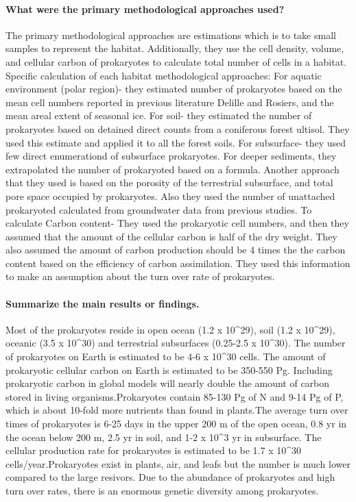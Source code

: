 \documentclass[]{article}
\let\oldparagraph\paragraph
\renewcommand{\paragraph}[1]{\oldparagraph{#1}\mbox{}}
\begin{document}
\paragraph{What were the primary methodological approaches
used?}\label{what-were-the-primary-methodological-approaches-used}

The primary methodological approaches are estimations which is to take
small samples to represent the habitat. Additionally, they use the cell
density, volume, and cellular carbon of prokaryotes to calculate total
number of cells in a habitat. Specific calculation of each habitat
methodological approaches: For aquatic environment (polar region)- they
estimated number of prokaryotes based on the mean cell numbers reported
in previous literature Delille and Rosiers, and the mean areal extent of
seasonal ice. For soil- they estimated the number of prokaryotes based
on detained direct counts from a coniferous forest ultisol. They used
this estimate and applied it to all the forest soils. For subsurface-
they used few direct enumerationd of subsurface prokaryotes. For deeper
sediments, they extrapolated the number of prokaryoted based on a
formula. Another approach that they used is based on the porosity of the
terrestrial subsurface, and total pore space occupied by prokaryotes.
Also they used the number of unattached prokaryoted calculated from
groundwater data from previous studies. To calculate Carbon content-
They used the prokaryotic cell numbers, and then they assumed that the
amount of the cellular carbon is half of the dry weight. They also
assumed the amount of carbon production should be 4 times the the carbon
content based on the efficiency of carbon assimilation. They used this
information to make an assumption about the turn over rate of
prokaryotes.

\paragraph{Summarize the main results or
findings.}\label{summarize-the-main-results-or-findings.}

Most of the prokaryotes reside in open ocean (1.2 x 10\^{}29), soil (1.2
x 10\^{}29), oceanic (3.5 x 10\^{}30) and terrestrial subsurfaces
(0.25-2.5 x 10\^{}30). The number of prokaryotes on Earth is estimated
to be 4-6 x 10\^{}30 cells. The amount of prokaryotic cellular carbon on
Earth is estimated to be 350-550 Pg. Including prokaryotic carbon in
global models will nearly double the amount of carbon stored in living
organisms.Prokaryotes contain 85-130 Pg of N and 9-14 Pg of P, which is
about 10-fold more nutrients than found in plants.The average turn over
times of prokaryotes is 6-25 days in the upper 200 m of the open ocean,
0.8 yr in the ocean below 200 m, 2.5 yr in soil, and 1-2 x 10\^{}3 yr in
subsurface. The cellular production rate for prokaryotes is estimated to
be 1.7 x 10\^{}30 cells/year.Prokaryotes exist in plants, air, and leafs
but the number is much lower compared to the large resivors. Due to the
abundance of prokaryotes and high turn over rates, there is an enormous
genetic diversity among prokaryotes.
\end{document}
